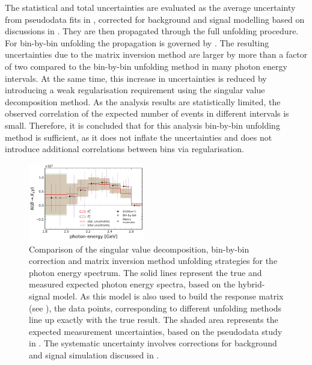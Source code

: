 The statistical and total uncertainties are evaluated as the average uncertainty from pseudodata fits in , corrected for background and signal modelling based on discussions in .
They are then propagated through the full unfolding procedure.
For bin-by-bin unfolding the propagation is governed by .
The resulting uncertainties due to the matrix inversion method are larger by more than a factor of two compared to the bin-by-bin unfolding method in many photon energy intervals.
At the same time, this increase in uncertainties is reduced by introducing a weak regularisation requirement using the singular value decomposition method.
As the analysis results are statistically limited, the observed correlation of the expected number of events in different \EB intervals is small.
Therefore, it is concluded that for this analysis bin-by-bin unfolding method is sufficient, as it does not inflate the uncertainties and does not introduce additional correlations between bins via regularisation.

\begin{figure}[htbp!]
    \centering
    \includegraphics[width=0.45\textwidth]{figures/signal_validation/bin_by_bin_svd_comparison_cov_mtx.pdf}
    \caption{\label{fig:unfolding_comparison}
    Comparison of the singular value decomposition, bin-by-bin correction and matrix inversion method unfolding strategies
    for the photon energy spectrum.
    The solid lines represent the true and measured expected photon energy spectra, based on the hybrid-signal model.
    As this model is also used to build the response matrix (see ), the data points, corresponding to different unfolding methods 
    line up exactly with the true result.
    The shaded area represents the expected measurement uncertainties, based on the pseudodata study in .
    The systematic uncertainty involves corrections for background and signal simulation discussed in .
    }
\end{figure}

